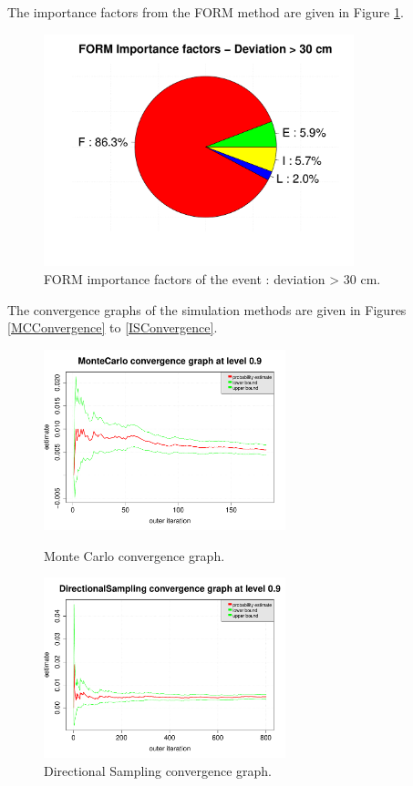 \documentclass[11pt]{article}
\begin{document}
The importance factors from the FORM method are given in Figure \ref{FormIF}.

\begin{figure}[Hhbtp]
  \begin{center}
    \includegraphics[width=9cm]{Figures/ImportanceFactorsDrawingFORM.pdf}
  \end{center}
  \caption{FORM importance factors of the event : deviation > 30 cm.}
  \label{FormIF}
\end{figure}

The convergence graphs of the simulation methods are given in Figures \ref{MCConvergence} to \ref{ISConvergence}.


\begin{figure}[Hhbtp]
  \begin{minipage}{9.8cm}
    \begin{center}
      \includegraphics[width=7cm]{Figures/convergenceGrapheMonteCarlo.pdf}
      \caption{Monte Carlo convergence graph.}
      \label{MCConvergence}
    \end{center}
  \end{minipage}
  \hfill
  \begin{minipage}{9.8cm}
    \begin{center}
      \includegraphics[width=7cm]{Figures/convergenceGrapheDS.pdf}
      \caption{Directional Sampling convergence graph.}
      \label{DSConvergence}
    \end{center}
  \end{minipage}
\end{figure}
\end{document}
